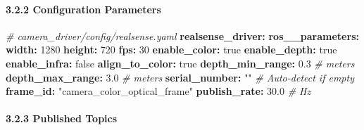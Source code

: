 \documentclass[
]{article}
\newenvironment{Shaded}{\begin{snugshade}}{\end{snugshade}}
\newcommand{\AttributeTok}[1]{\textcolor[rgb]{0.13,0.29,0.53}{#1}}
\newcommand{\CharTok}[1]{\textcolor[rgb]{0.31,0.60,0.02}{#1}}
\newcommand{\CommentTok}[1]{\textcolor[rgb]{0.56,0.35,0.01}{\textit{#1}}}
\newcommand{\DecValTok}[1]{\textcolor[rgb]{0.00,0.00,0.81}{#1}}
\newcommand{\FloatTok}[1]{\textcolor[rgb]{0.00,0.00,0.81}{#1}}
\newcommand{\FunctionTok}[1]{\textcolor[rgb]{0.13,0.29,0.53}{\textbf{#1}}}
\newcommand{\KeywordTok}[1]{\textcolor[rgb]{0.13,0.29,0.53}{\textbf{#1}}}
\newcommand{\StringTok}[1]{\textcolor[rgb]{0.31,0.60,0.02}{#1}}
\begin{document}
\hypertarget{configuration-parameters}{%
\paragraph{3.2.2 Configuration
Parameters}\label{configuration-parameters}}

\begin{Shaded}
\begin{Highlighting}[]
\CommentTok{\# camera\_driver/config/realsense.yaml}
\FunctionTok{realsense\_driver}\KeywordTok{:}
\AttributeTok{  }\FunctionTok{ros\_\_parameters}\KeywordTok{:}
\AttributeTok{    }\FunctionTok{width}\KeywordTok{:}\AttributeTok{ }\DecValTok{1280}
\AttributeTok{    }\FunctionTok{height}\KeywordTok{:}\AttributeTok{ }\DecValTok{720}
\AttributeTok{    }\FunctionTok{fps}\KeywordTok{:}\AttributeTok{ }\DecValTok{30}
\AttributeTok{    }\FunctionTok{enable\_color}\KeywordTok{:}\AttributeTok{ }\CharTok{true}
\AttributeTok{    }\FunctionTok{enable\_depth}\KeywordTok{:}\AttributeTok{ }\CharTok{true}
\AttributeTok{    }\FunctionTok{enable\_infra}\KeywordTok{:}\AttributeTok{ }\CharTok{false}
\AttributeTok{    }\FunctionTok{align\_to\_color}\KeywordTok{:}\AttributeTok{ }\CharTok{true}
\AttributeTok{    }\FunctionTok{depth\_min\_range}\KeywordTok{:}\AttributeTok{ }\FloatTok{0.3}\CommentTok{  \# meters}
\AttributeTok{    }\FunctionTok{depth\_max\_range}\KeywordTok{:}\AttributeTok{ }\FloatTok{3.0}\CommentTok{  \# meters}
\AttributeTok{    }\FunctionTok{serial\_number}\KeywordTok{:}\AttributeTok{ }\StringTok{""}\CommentTok{     \# Auto{-}detect if empty}
\AttributeTok{    }\FunctionTok{frame\_id}\KeywordTok{:}\AttributeTok{ }\StringTok{"camera\_color\_optical\_frame"}
\AttributeTok{    }\FunctionTok{publish\_rate}\KeywordTok{:}\AttributeTok{ }\FloatTok{30.0}\CommentTok{    \# Hz}
\end{Highlighting}
\end{Shaded}

\hypertarget{published-topics}{%
\paragraph{3.2.3 Published Topics}\label{published-topics}}
\end{document}
